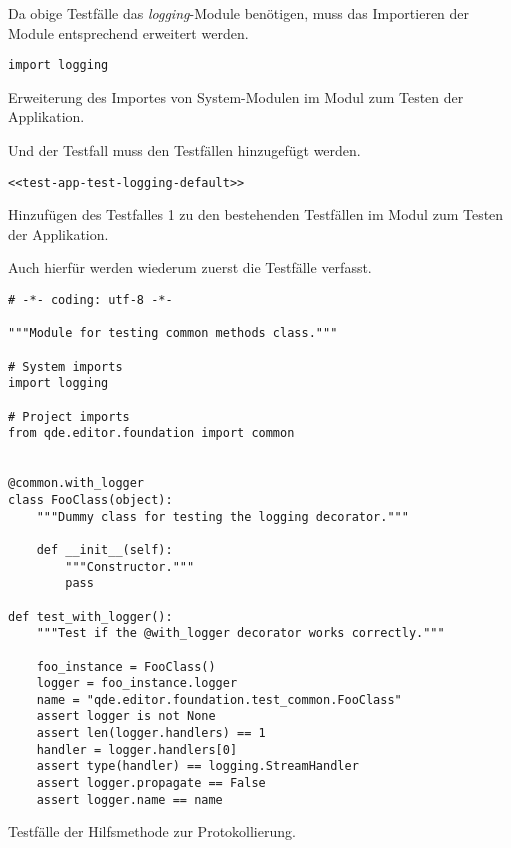\documentclass[10pt, openright, notitlepage]{scrreprt}
\begin{document}
Da obige Testfälle das \emph{logging}-Module benötigen, muss das Importieren der Module
entsprechend erweitert werden.

\begin{listing}[H]
\begin{verbatim}
import logging
\end{verbatim}
\caption{\label{orgbf36df9}
Erweiterung des Importes von System-Modulen im Modul zum Testen der Applikation.}
\end{listing}

Und der Testfall muss den Testfällen hinzugefügt werden.

\begin{listing}[H]
\begin{verbatim}
<<test-app-test-logging-default>>
\end{verbatim}
\caption{\label{org2d205f7}
Hinzufügen des Testfalles 1 zu den bestehenden Testfällen im Modul zum Testen der Applikation.}
\end{listing}

Auch hierfür werden wiederum zuerst die Testfälle verfasst.

\begin{listing}[H]
\begin{verbatim}
# -*- coding: utf-8 -*-

"""Module for testing common methods class."""

# System imports
import logging

# Project imports
from qde.editor.foundation import common


@common.with_logger
class FooClass(object):
    """Dummy class for testing the logging decorator."""

    def __init__(self):
        """Constructor."""
        pass

def test_with_logger():
    """Test if the @with_logger decorator works correctly."""

    foo_instance = FooClass()
    logger = foo_instance.logger
    name = "qde.editor.foundation.test_common.FooClass"
    assert logger is not None
    assert len(logger.handlers) == 1
    handler = logger.handlers[0]
    assert type(handler) == logging.StreamHandler
    assert logger.propagate == False
    assert logger.name == name
\end{verbatim}
\caption{\label{org72c710e}
Testfälle der Hilfsmethode zur Protokollierung.}
\end{listing}
\end{document}
